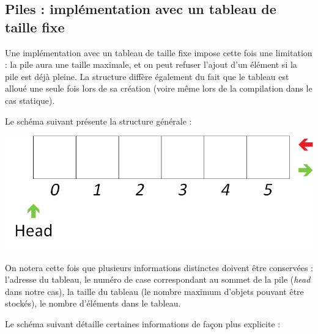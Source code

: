 \bigskip


\subsection{Piles : implémentation avec un tableau de taille fixe}

\bigskip

Une implémentation avec un tableau de taille fixe impose cette fois une limitation : la pile aura une taille maximale, et on peut refuser l'ajout d'un élément si la pile est déjà pleine.
La structure diffère également du fait que le tableau est alloué une seule fois lors de sa création (voire même lors de la compilation dans le cas statique).

Le schéma suivant présente la structure générale :\\

\begin{center}
\includegraphics[scale=1]{Cours/Piles_5_Tableau_Statique_Structure.png}
\end{center}

\smallskip

On notera cette fois que plusieurs informations distinctes doivent être conservées : l'adresse du tableau, le numéro de case correspondant au sommet de la pile (\textit{head} dans notre cas), la taille du tableau (le nombre maximum d'objets pouvant être stockés), le nombre d'éléments dans le tableau.

Le schéma suivant détaille certaines informations de façon plus explicite :\\

